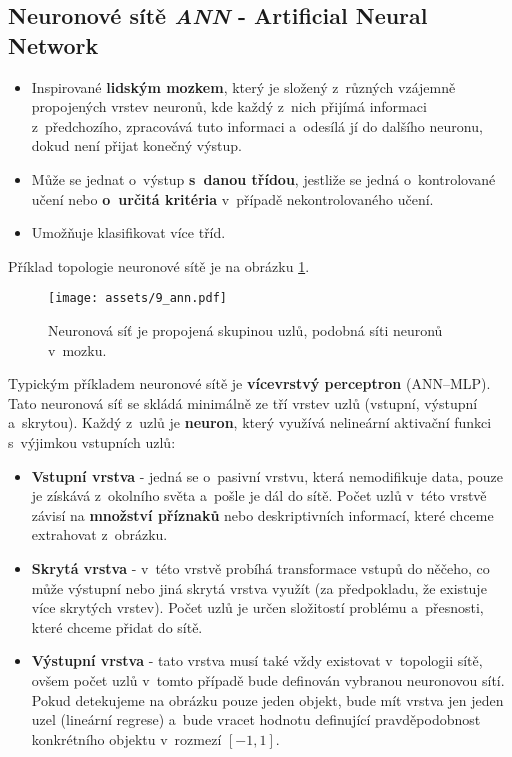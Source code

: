 \subsection{Neuronové sítě \textit{ANN} - Artificial Neural Network}
\begin{itemize}
    \item Inspirované \textbf{lidským mozkem}, který je složený z~různých vzájemně propojených vrstev neuronů, kde každý z~nich přijímá informaci z~předchozího, zpracovává tuto informaci a~odesílá jí do dalšího neuronu, dokud není přijat konečný výstup.
    \item Může se jednat o~výstup \textbf{s~danou třídou}, jestliže se jedná o~kontrolované učení nebo \textbf{o~určitá kritéria} v~případě nekontrolovaného učení.
    \item Umožňuje klasifikovat více tříd.
\end{itemize}
Příklad topologie neuronové sítě je na obrázku \ref{fig:ann}.
\begin{figure}[H]
    \centering
    \texttt{[image: assets/9\_ann.pdf]}
    \caption{Neuronová síť je propojená skupinou uzlů, podobná síti neuronů v~mozku.}
    \label{fig:ann}
\end{figure}

Typickým příkladem neuronové sítě je \textbf{vícevrstvý perceptron} (ANN--MLP). Tato neuronová síť se skládá minimálně ze tří vrstev uzlů (vstupní, výstupní a~skrytou). Každý z~uzlů je \textbf{neuron}, který využívá nelineární aktivační funkci s~výjimkou vstupních uzlů:
\begin{itemize}
    \item{\textbf{Vstupní vrstva} - jedná se o~pasivní vrstvu, která nemodifikuje data, pouze je získává z~okolního světa a~pošle je dál do sítě. Počet uzlů v~této vrstvě závisí na \textbf{množství příznaků} nebo deskriptivních informací, které chceme extrahovat z~obrázku.}
    \item{\textbf{Skrytá vrstva} - v~této vrstvě probíhá transformace vstupů do něčeho, co může výstupní nebo jiná skrytá vrstva využít (za předpokladu, že existuje více skrytých vrstev). Počet uzlů je určen složitostí problému a~přesnosti, které chceme přidat do sítě.}
    \item{\textbf{Výstupní vrstva} - tato vrstva musí také vždy existovat v~topologii sítě, ovšem počet uzlů v~tomto případě bude definován vybranou neuronovou sítí. Pokud detekujeme na obrázku pouze jeden objekt, bude mít vrstva jen jeden uzel (lineární regrese) a~bude vracet hodnotu definující pravděpodobnost konkrétního objektu v~rozmezí $[-1,1]$.}
\end{itemize}

